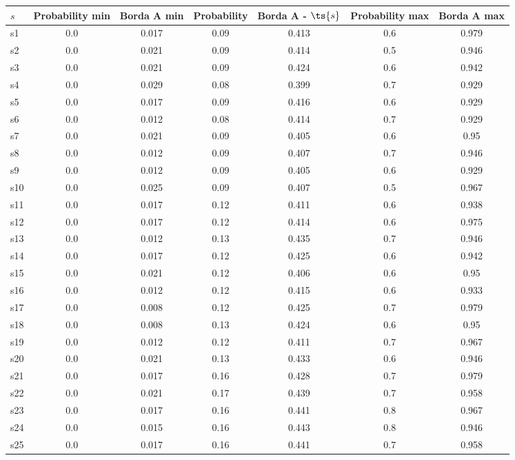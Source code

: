 \documentclass{article}
\begin{document}
\noindent\begin{tabular}{|l|c|c|c|c|c|c|}
\hline
$s$& Probability min & Borda A min & Probability & Borda A - $\ts{s}$ & Probability max & Borda A max\\
\hline
s1 &0.0 & 0.017 & 0.09 & 0.413 & 0.6 & 0.979\\
\hline
s2 &0.0 & 0.021 & 0.09 & 0.414 & 0.5 & 0.946\\
\hline
s3 &0.0 & 0.021 & 0.09 & 0.424 & 0.6 & 0.942\\
\hline
s4 &0.0 & 0.029 & 0.08 & 0.399 & 0.7 & 0.929\\
\hline
s5 &0.0 & 0.017 & 0.09 & 0.416 & 0.6 & 0.929\\
\hline
s6 &0.0 & 0.012 & 0.08 & 0.414 & 0.7 & 0.929\\
\hline
s7 &0.0 & 0.021 & 0.09 & 0.405 & 0.6 & 0.95\\
\hline
s8 &0.0 & 0.012 & 0.09 & 0.407 & 0.7 & 0.946\\
\hline
s9 &0.0 & 0.012 & 0.09 & 0.405 & 0.6 & 0.929\\
\hline
s10 &0.0 & 0.025 & 0.09 & 0.407 & 0.5 & 0.967\\
\hline
s11 &0.0 & 0.017 & 0.12 & 0.411 & 0.6 & 0.938\\
\hline
s12 &0.0 & 0.017 & 0.12 & 0.414 & 0.6 & 0.975\\
\hline
s13 &0.0 & 0.012 & 0.13 & 0.435 & 0.7 & 0.946\\
\hline
s14 &0.0 & 0.017 & 0.12 & 0.425 & 0.6 & 0.942\\
\hline
s15 &0.0 & 0.021 & 0.12 & 0.406 & 0.6 & 0.95\\
\hline
s16 &0.0 & 0.012 & 0.12 & 0.415 & 0.6 & 0.933\\
\hline
s17 &0.0 & 0.008 & 0.12 & 0.425 & 0.7 & 0.979\\
\hline
s18 &0.0 & 0.008 & 0.13 & 0.424 & 0.6 & 0.95\\
\hline
s19 &0.0 & 0.012 & 0.12 & 0.411 & 0.7 & 0.967\\
\hline
s20 &0.0 & 0.021 & 0.13 & 0.433 & 0.6 & 0.946\\
\hline
s21 &0.0 & 0.017 & 0.16 & 0.428 & 0.7 & 0.979\\
\hline
s22 &0.0 & 0.021 & 0.17 & 0.439 & 0.7 & 0.958\\
\hline
s23 &0.0 & 0.017 & 0.16 & 0.441 & 0.8 & 0.967\\
\hline
s24 &0.0 & 0.015 & 0.16 & 0.443 & 0.8 & 0.946\\
\hline
s25 &0.0 & 0.017 & 0.16 & 0.441 & 0.7 & 0.958\\
\hline

\end{tabular}
\end{document}
